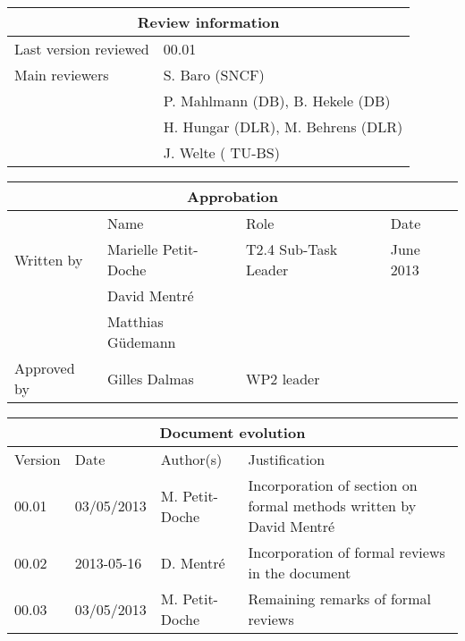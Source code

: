 \documentclass{template/openetcs_article}
\begin{document}
\begin{tabular}{|p{4.4cm}|p{8.7cm}|}
\hline
\multicolumn{2}{|c|}{Review information} \\
\hline
Last version reviewed & 00.01 \\
\hline
Main reviewers & S. Baro (SNCF) \\
& P. Mahlmann (DB), B. Hekele (DB)\\
& H. Hungar (DLR), M. Behrens (DLR) \\
& J. Welte ( TU-BS) \\
\hline
\end{tabular}

\begin{tabular}{|p{2.2cm}|p{4cm}|p{4cm}|p{2cm}|}
\hline
\multicolumn{4}{|c|}{Approbation} \\
\hline
  &  Name & Role & Date   \\
\hline  
Written by    &  Marielle Petit-Doche & T2.4 Sub-Task Leader  & June 2013 \\
& David Mentré & & \\
& Matthias Güdemann & & \\
\hline
Approved by & Gilles Dalmas & WP2 leader & \\
\hline
\end{tabular}

\begin{tabular}{|p{2.2cm}|p{2cm}|p{3cm}|p{5cm}|}
\hline
\multicolumn{4}{|c|}{Document evolution} \\
\hline
Version &  Date & Author(s) & Justification  \\
\hline  
00.01 & 03/05/2013 & M. Petit-Doche &  Incorporation of section on formal methods written by David Mentré \\
\hline  
00.02 & 2013-05-16 & D. Mentré &  Incorporation of formal reviews in
the document \\
\hline  
00.03 & 03/05/2013 & M. Petit-Doche &  Remaining remarks of formal reviews \\
\hline  

\end{tabular}




\newcommand{\tbd}{\colorbox{cyan}{\%\%To Be Defined\%\%}}
\newcommand{\tbc}{\colorbox{cyan}{\%\%To Be Confirmed\%\%}}
\newcommand{\todo}[1]{\colorbox{cyan}{\%\%{#1}\%\%}}
\newlength{\origindent}
\end{document}
